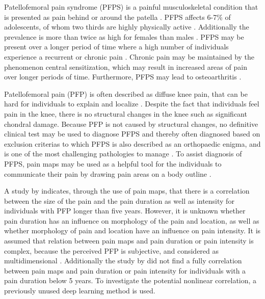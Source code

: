 Patellofemoral pain syndrome (PFPS) is a painful musculoskeletal condition that is presented as pain behind or around the patella \citep{Maclachlan2017, Smith2015}. PFPS affects 6-7\% of adolescents, of whom two thirds are highly physically active \citep{Rathleff2015}. Additionally the prevalence is more than twice as high for females than males \citep{Rathleff2015, Petersen2013}.
PFPS may be present over a longer period of time where a high number of individuals experience a recurrent or chronic pain \citep{Witvrouw2014}. Chronic pain may be maintained by the phenomenon central sensitization, which may result in increased areas of pain over longer periods of time. Furthermore, PFPS may lead to osteoarthritis \citep{Petersen2013, Crossley2016}. 

\noindent
Patellofemoral pain (PFP) is often described as diffuse knee pain, that can be hard for individuals to explain and localize \citep{Witvrouw2014}. Despite the fact that individuals feel pain in the knee, there is no structural changes in the knee such as significant chondral damage. Because PFP is not caused by structural changes, no definitive clinical test may be used to diagnose PFPS and thereby often diagnosed based on exclusion criterias \citep{Petersen2013} to which PFPS is also described as an orthopaedic enigma, and is one of the most challenging pathologies to manage \citep{Dye2001}.
To assist diagnosis of PFPS, pain maps may be used as a helpful tool for the individuals to communicate their pain by drawing pain areas on a body outline \citep{Boudreau2016}.

\noindent
A study by \citeauthor{Boudreau2017} indicates, through the use of pain maps, that there is a correlation between the size of the pain and the pain duration as well as intensity for individuals with PFP longer than five years.\citep{Boudreau2017}\newline
\noindent
However, it is unknown whether pain duration has an influence on morphology of the pain and location, as well as  whether morphology of pain and location have an influence on pain intensity.
It is assumed that relation between pain maps and pain duration or pain intensity is complex, because the perceived PFP is subjective, and considered as multidimensional \citep{Dansie2013}. Additionally the study by \citeauthor{Boudreau2017} did not find a fully correlation between pain maps and pain duration or pain intensity for individuals with a pain duration below 5 years. To investigate the potential nonlinear correlation, a previously unused deep learning method is used. 

